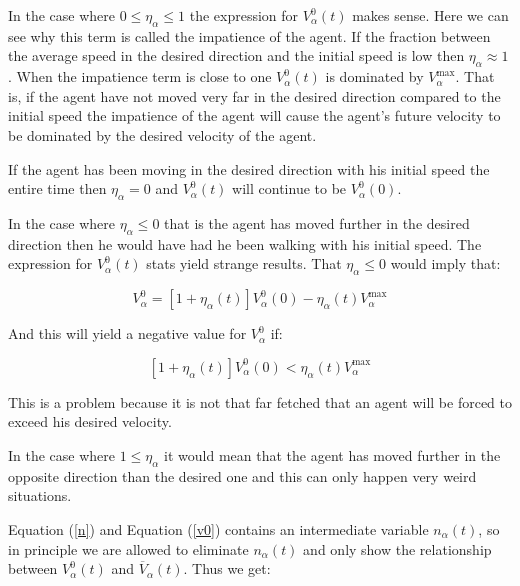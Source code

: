 In the case where $0 \leq \eta_{\alpha} \leq 1$ the expression for 
$V_{\alpha}^{0} \left( t \right)$  makes sense. Here we can see why this term 
is called the impatience of the agent. If the fraction  between the average 
speed in the desired direction and the initial speed is low then $\eta_{\alpha} \approx 1$. 
When the impatience term is close to one $V_{\alpha}^{0} \left( t \right)$ 
is dominated by $V_{\alpha}^{\text{max}}$. That is, if the agent have not 
moved very far in the desired direction compared to the initial speed the 
impatience of the agent will cause the agent's future velocity to be dominated by 
the desired velocity of the agent.

If the agent has been moving in the desired direction with his initial 
speed the entire time then $\eta_{\alpha} = 0$  and 
$V_{\alpha}^{0} \left( t \right)$ will continue to be $V_{\alpha}^{0} \left( 0 \right)$.

In the case where $\eta_{\alpha} \leq 0$ that is the agent has moved further 
in the desired direction then he would have had he been walking with his 
initial speed. The expression for $V_{\alpha}^{0} \left( t \right)$
stats yield strange results. That $\eta_{\alpha} \leq 0$ would imply that:

\begin{equation}\label{n}
    V_{\alpha}^{0} = \left[ 1 + \eta_{\alpha} \left( t \right) \right] 
    V_{\alpha}^{0} \left( 0 \right) -
    \eta_{\alpha} \left( t \right)V_{\alpha}^{\text{max}}
\end{equation}

And this will yield a negative value for $V_{\alpha}^{0}$ if: 

\begin{equation}
\left[ 1 + \eta_{\alpha} \left( t \right) \right] 
V_{\alpha}^{0} \left( 0 \right) < \eta_{\alpha} \left( t \right)V_{\alpha}^{\text{max}} 
\end{equation}

This is a problem because it is not that far fetched that an agent will be 
forced to exceed his desired velocity.

In the case where $1 \leq \eta_{\alpha}$ it would mean that the agent has moved 
further in the opposite direction than the desired one and this can only happen very 
weird situations.

Equation (\ref{n}) and Equation (\ref{v0}) contains an intermediate variable $ n_{\alpha} \left( t \right) $, 
so in principle we are allowed to eliminate $ n_{\alpha} \left( t \right) $ and only show the 
relationship between $ V_{\alpha}^{0}(t) $ and $ \overline{V}_{\alpha} \left( t \right) $. Thus we get:


